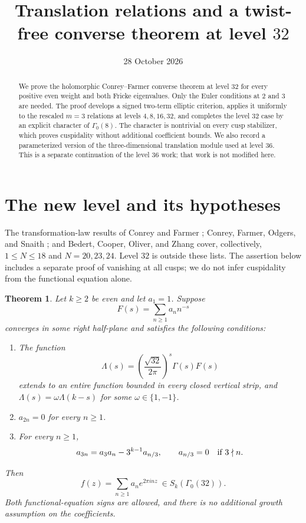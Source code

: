 \documentclass[11pt]{article}
\title{Translation relations and a twist-free converse theorem at level $32$}
\author{}
\date{28 October 2026}
\newtheorem{theorem}{Theorem}
\theoremstyle{remark}
\begin{document}
\maketitle
\begin{abstract}
We prove the holomorphic Conrey--Farmer converse theorem at level $32$
for every positive even weight and both Fricke eigenvalues. Only the
Euler conditions at $2$ and $3$ are needed. The proof develops a signed
two-term elliptic criterion, applies it uniformly to the rescaled
$m=3$ relations at levels $4,8,16,32$, and completes the level $32$
case by an explicit character of $\Gamma_0(8)$. The character is
nontrivial on every cusp stabilizer, which proves cuspidality without
additional coefficient bounds. We also record a parameterized version
of the three-dimensional translation module used at level $36$.
This is a separate continuation of the level $36$ work; that work is
not modified here.
\end{abstract}

\section{The new level and its hypotheses}

The transformation-law results of Conrey and Farmer \cite{CF};
Conrey, Farmer, Odgers, and Snaith \cite{CFOS}; and
Bedert, Cooper, Oliver, and Zhang \cite{BCOZ} cover, collectively,
$1\leq N\leq18$ and $N=20,23,24$. Level $32$ is outside these lists.
The assertion below includes a separate proof of vanishing at all cusps;
we do not infer cuspidality from the functional equation alone.

\begin{theorem}\label{thm:32}
Let $k\geq2$ be even and let $a_1=1$. Suppose
\[
 F(s)=\sum_{n\geq1}a_n n^{-s}
\]
converges in some right half-plane and satisfies the following conditions:
\begin{enumerate}
\item The function
\[
 \Lambda(s)=\left(\frac{\sqrt{32}}{2\pi}\right)^s\Gamma(s)F(s)
\]
extends to an entire function bounded in every closed vertical strip,
and $\Lambda(s)=\omega\Lambda(k-s)$ for some $\omega\in\{1,-1\}$.
\item $a_{2n}=0$ for every $n\geq1$.
\item For every $n\geq1$,
\[
 a_{3n}=a_3a_n-3^{k-1}a_{n/3},
 \qquad a_{n/3}=0\quad\hbox{if }3\nmid n.
\]
\end{enumerate}
Then
\[
 f(z)=\sum_{n\geq1}a_n e^{2\pi inz}\ \in S_k(\Gamma_0(32)).
\]
Both functional-equation signs are allowed, and there is no additional
growth assumption on the coefficients.
\end{theorem}
\end{document}
